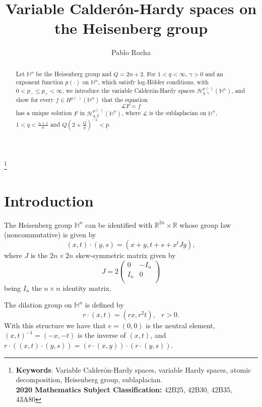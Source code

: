 \documentclass[oneside,10pt]{article}
\newcommand\blfootnote[1]{%
  \begingroup
  \renewcommand\thefootnote{}\footnote{#1}%
  \addtocounter{footnote}{-1}%
  \endgroup}
\begin{document}
\title{Variable Calder\'on-Hardy spaces on the Heisenberg group}
\author{Pablo Rocha}

\maketitle


\begin{abstract}
Let $\mathbb{H}^{n}$ be the Heisenberg group and $Q = 2n+2$. For $1 < q < \infty$, $\gamma > 0$ and an exponent function $p(\cdot)$ on 
$\mathbb{H}^n$, which satisfy log-H\"older conditions, with $0 < p_{-} \leq p_{+} < \infty$, we introduce the variable 
Calder\'on-Hardy spaces $\mathcal{H}^{p(\cdot)}_{q, \gamma}(\mathbb{H}^{n})$, and show for every $f \in H^{p(\cdot)}(\mathbb{H}^{n})$ that the equation
\[
\mathcal{L} F = f
\]
has a unique solution $F$ in $\mathcal{H}^{p(\cdot)}_{q, 2}(\mathbb{H}^{n})$, where $\mathcal{L}$ is the sublaplacian on $\mathbb{H}^{n}$, 
$1 < q < \frac{n+1}{n}$ and $Q (2 + \frac{Q}{q})^{-1} < \underline{p}$.
\end{abstract}

\blfootnote{{\bf Keywords}: Variable Calder\'on-Hardy spaces, variable Hardy spaces, atomic decomposition, Heisenberg group, sublaplacian. \\
{\bf 2020 Mathematics Subject Classification:} 42B25, 42B30, 42B35, 43A80}

\section{Introduction}

The  Heisenberg group $\mathbb{H}^{n}$ can be identified with $\mathbb{R}^{2n} \times \mathbb{R}$ whose group law 
(noncommutative) is given by
\begin{equation} \label{group law}
(x,t) \cdot (y,s) = \left( x+y, t+s + x^{t} J y \right),
\end{equation}
where $J$ is the $2n \times 2n$ skew-symmetric matrix given by
\[
J= 2 \left( \begin{array}{cc}
                           0 & -I_n \\
                           I_n & 0 \\
                                      \end{array} \right)
\]
being $I_n$ the $n \times n$ identity matrix.

The dilation group on $\mathbb{H}^n$ is defined by 
\[
r \cdot (x,t) = (rx, r^{2}t), \,\,\,\ r > 0.
\]
With this structure we have that $e = (0,0)$ is the neutral element, $(x, t)^{-1}=(-x, -t)$ is the inverse of $(x, t)$, and
$r \cdot((x,t) \cdot (y,s)) = (r\cdot(x,y)) \cdot (r\cdot(y,s))$. 
\end{document}
